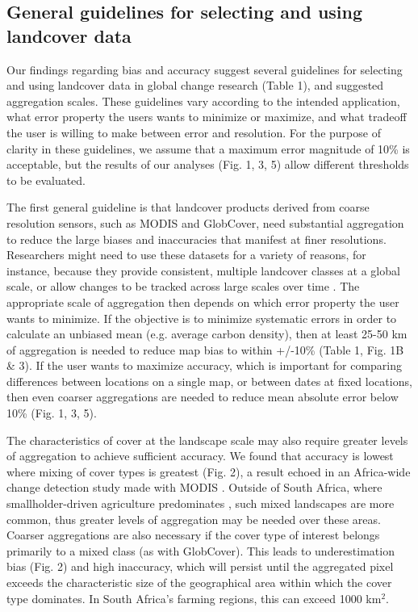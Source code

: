 \documentclass{pnastwo}
\begin{document}
\begin{article}
\subsection{General guidelines for selecting and using landcover data}
Our findings regarding bias and accuracy suggest several guidelines for selecting and using landcover data in global change research (Table 1), and suggested aggregation scales. These guidelines vary according to the intended application, what error property the users wants to minimize or maximize, and what tradeoff the user is willing to make between error and resolution.  For the purpose of clarity in these guidelines, we assume that a maximum error magnitude of 10\% is acceptable, but the results of our analyses (Fig. 1, 3, 5) allow different thresholds to be  evaluated.  

The first general guideline is that landcover products derived from coarse resolution sensors, such as MODIS and GlobCover, need substantial aggregation to reduce the large biases and inaccuracies that manifest at finer resolutions. Researchers might need to use these datasets for a variety of reasons, for instance, because they provide consistent, multiple landcover classes at a global scale, or allow changes to be tracked across large scales over time \cite{luoto_predicting_2004}. The appropriate scale of aggregation then depends on which error property the user wants to minimize. If the objective is to minimize systematic errors in order to calculate an unbiased mean (e.g. average carbon density), then at least 25-50 km of aggregation is needed to reduce map bias to within +/-10\% (Table 1, Fig. 1B \& 3). If the user wants to maximize accuracy, which is important for comparing differences between locations on a single map, or between dates at fixed locations, then even coarser aggregations are needed to reduce mean absolute error below 10\% (Fig. 1, 3, 5).  

The characteristics of cover at the landscape scale may also require greater levels of aggregation to achieve sufficient accuracy. We found that accuracy is lowest where mixing of cover types is greatest (Fig. 2), a result echoed in an Africa-wide change detection study made with MODIS \cite{gross_monitoring_2013}. Outside of South Africa, where smallholder-driven agriculture predominates \cite{lambin_estimating_????}, such mixed landscapes are more common, thus greater levels of aggregation may be needed over these areas. Coarser aggregations are also necessary if the cover type of interest belongs primarily to a mixed class (as with GlobCover). This leads to underestimation bias (Fig. 2) and high inaccuracy, which will persist until the aggregated pixel exceeds the characteristic size of the geographical area within which the cover type dominates. In South Africa's farming regions, this can exceed 1000 km$^2$. 


\end{article}
\end{document}
